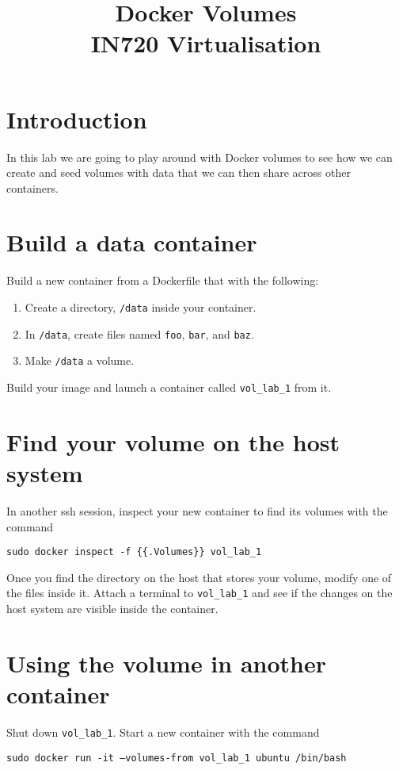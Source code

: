 \documentclass{article}
\begin{document}
\title{Docker Volumes\\ IN720 Virtualisation}
\date{}
\maketitle

\section*{Introduction}
In this lab we are going to play around with Docker volumes to see how we can create and seed volumes with data that we can then share across other containers.


\section{Build a data container}
Build a new container from a Dockerfile that with the following:

\begin{enumerate}
	\item Create a directory, \texttt{/data} inside your container.
	\item In \texttt{/data}, create files named \texttt{foo}, \texttt{bar}, and \texttt{baz}.
	\item Make \texttt{/data} a volume.
\end{enumerate}

Build your image and launch a container called \texttt{vol\_lab\_1} from it.


\section{Find your volume on the host system}
In another ssh session, inspect your new container to find its volumes with the command

\texttt{sudo docker inspect -f \{\{.Volumes\}\} vol\_lab\_1}

Once you find the directory on the host that stores your volume, modify one of the files inside it.  Attach a terminal to \texttt{vol\_lab\_1} and see if the changes on the host system are visible inside the container.

\section{Using the volume in another container}
Shut down \texttt{vol\_lab\_1}.  Start a new container with the command

\texttt{sudo docker run -it  --volumes-from vol\_lab\_1 ubuntu /bin/bash}
\end{document}
